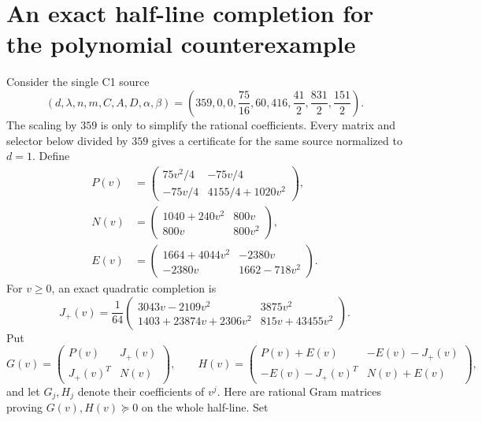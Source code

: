 \section*{An exact half-line completion for the polynomial counterexample}
Consider the single C1 source
\[
 (d,\lambda,n,m,C,A,D,\alpha,\beta)
 =\left(359,0,0,\frac{75}{16},60,416,
          \frac{41}{2},\frac{831}{2},\frac{151}{2}\right).
\]
The scaling by $359$ is only to simplify the rational coefficients.
Every matrix and selector below divided by $359$ gives a certificate
for the same source normalized to $d=1$.
Define
\begin{align*}
 P(v)&=\begin{pmatrix}
 75v^2/4&-75v/4\\-75v/4&4155/4+1020v^2
 \end{pmatrix},\\
 N(v)&=\begin{pmatrix}1040+240v^2&800v\\800v&800v^2\end{pmatrix},\\
 E(v)&=\begin{pmatrix}1664+4044v^2&-2380v\\-2380v&1662-718v^2\end{pmatrix}.
\end{align*}
For $v\ge0$, an exact quadratic completion is
\begin{equation}
 \boxed{J_+(v)=\frac1{64}
 \begin{pmatrix}
 3043v-2109v^2&3875v^2\\
 1403+23874v+2306v^2&815v+43455v^2
 \end{pmatrix}.}                                      \label{halfline:witness-J}
\end{equation}
Put
\[
 G(v)=\begin{pmatrix}P(v)&J_+(v)\\J_+(v)^T&N(v)\end{pmatrix},\qquad
 H(v)=\begin{pmatrix}P(v)+E(v)&-E(v)-J_+(v)\\
                    -E(v)-J_+(v)^T&N(v)+E(v)\end{pmatrix},
\]
and let $G_j,H_j$ denote their coefficients of $v^j$.
Here are rational Gram matrices proving $G(v),H(v)\succeq0$ on the
whole half-line. Set
